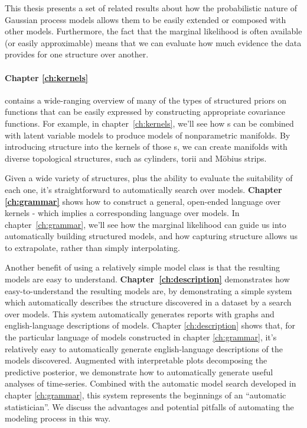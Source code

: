 This thesis presents a set of related results about how the probabilistic nature of Gaussian process models allows them to be easily extended or composed with other models.
Furthermore, the fact that the marginal likelihood is often available (or easily approximable) means that we can evaluate how much evidence the data provides for one structure over another.

\paragraph{Chapter \ref{ch:kernels}} contains a wide-ranging overview of many of the types of structured priors on functions that can be easily expressed by constructing appropriate covariance functions.
For example, in chapter~\ref{ch:kernels}, we'll see how \gp{}s can be combined with latent variable models to produce models of nonparametric manifolds.
By introducing structure into the kernels of those \gp{}s, we can create manifolds with diverse topological structures, such as cylinders, torii and M\"obius strips.

Given a wide variety of structures, plus the ability to evaluate the suitability of each one, it's straightforward to automatically search over models.
{\bf Chapter \ref{ch:grammar}} shows how to construct a general, open-ended language over kernels - which implies a corresponding language over models.
In chapter~\ref{ch:grammar}, we'll see how the marginal likelihood can guide us into automatically building structured models, and how capturing structure allows us to extrapolate, rather than simply interpolating.

Another benefit of using a relatively simple model class is that the resulting models are easy to understand.
{\bf Chapter~\ref{ch:description}} demonstrates how easy-to-understand the resulting models are, by demonstrating a simple system which automatically describes the structure discovered in a dataset by a search over \gp{} models.
This system automatically generates reports with graphs and english-language descriptions of \gp{} models.
Chapter \ref{ch:description} shows that, for the particular language of models constructed in chapter \ref{ch:grammar}, it's relatively easy to automatically generate english-language descriptions of the models discovered.
Augmented with interpretable plots decomposing the predictive posterior, we demonstrate how to automatically generate useful analyses of time-series.
Combined with the automatic model search developed in chapter \ref{ch:grammar}, this system represents the beginnings of an ``automatic statistician''.
We discuss the advantages and potential pitfalls of automating the modeling process in this way.

